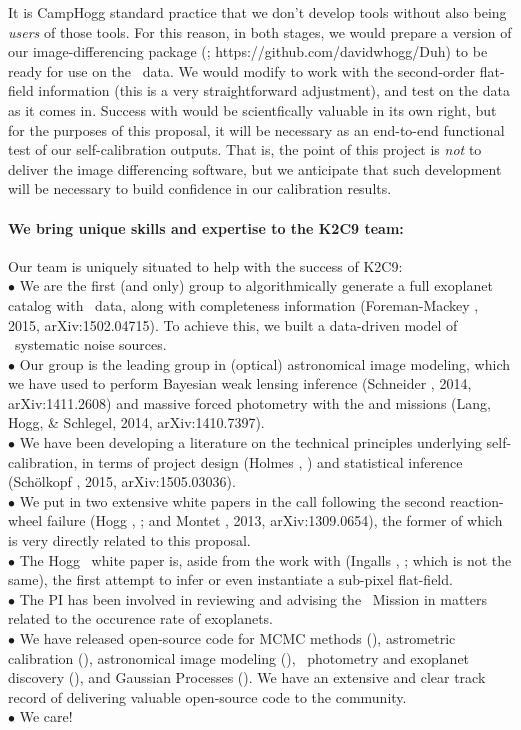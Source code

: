 \documentclass[12pt,preprint]{aastex}
\begin{document}
It is CampHogg standard practice that we don't develop tools without
also being \emph{users} of those tools.
For this reason, in both stages, we would prepare a version of our
image-differencing package (; https://github.com/davidwhogg/Duh)
to be ready for use on the \ktwo\ data.
We would modify  to work with the second-order flat-field
information (this is a very straightforward adjustment), and test
 on the data as it comes in.
Success with  would be scientfically valuable in its own
right, but for the purposes of this proposal, it will be necessary as
an end-to-end functional test of our self-calibration outputs.
That is, the point of this project is \emph{not} to deliver the image
differencing software, but we anticipate that such development will be
necessary to build confidence in our calibration results.

\paragraph{We bring unique skills and expertise to the K2C9 team:}

Our team is uniquely situated to help with the success of K2C9:\\
$\bullet$ We are the first (and only) group to algorithmically
generate a full exoplanet catalog with \ktwo\ data, along with
completeness information (Foreman-Mackey \etal, 2015,
arXiv:1502.04715).
To achieve this, we built a data-driven model of \ktwo\ systematic
noise sources.\\
$\bullet$ Our group is the leading group in (optical) astronomical
image modeling, which we have used to perform Bayesian weak lensing
inference (Schneider \etal, 2014, arXiv:1411.2608) and
massive forced photometry with the  and 
missions (Lang, Hogg, \& Schlegel, 2014,
arXiv:1410.7397).\\
$\bullet$ We have been developing a literature on the technical
principles underlying self-calibration, in terms of project design
(Holmes \etal, \opcit) and statistical inference
(Sch\"olkopf \etal, 2015, arXiv:1505.03036).\\
$\bullet$ We put in two extensive white papers in the call following
the second reaction-wheel failure (Hogg \etal, \opcit; and
Montet \etal, 2013, arXiv:1309.0654), the former of which is very directly
related to this proposal.\\
$\bullet$ The Hogg \etal\ white paper is, aside from the work with
\spitzer (Ingalls \etal, \opcit; which is not the same), the first attempt
to infer or even instantiate a sub-pixel flat-field.\\
$\bullet$ The PI has
been involved in reviewing and advising the \kepler\ Mission
in matters related to the occurence rate of exoplanets.\\
$\bullet$ We have released open-source code for MCMC methods
(), astrometric calibration (),
astronomical image modeling (), \ktwo\ photometry
and exoplanet discovery (), and Gaussian Processes
().  We have an extensive and clear track record of
delivering valuable open-source code to the community.\\
$\bullet$ We care!
\end{document}

